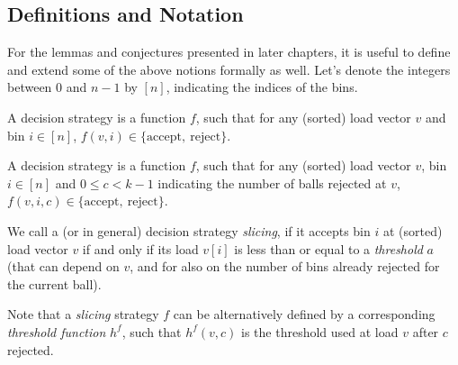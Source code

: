 \subsection{Definitions and Notation} \label{notation}

For the lemmas and conjectures presented in later chapters, it is useful to define and extend some of the above notions formally as well. Let's denote the integers between $0$ and $n-1$ by $[n]$, indicating the indices of the bins.


\begin{definition} 
A \TwoThinning decision strategy is a function $f$, such that for any (sorted) load vector $v$ and bin $i\in[n]$, $f(v, i)\in\{\mathrm{accept},\ \mathrm{reject}\}$.
\end{definition}


\begin{definition} 
A \KThinning decision strategy is a function $f$, such that for any (sorted) load vector $v$, bin $i\in[n]$ and $0\leq c<k-1$ indicating the number of balls rejected at $v$, $f(v, i, c)\in\{\mathrm{accept},\ \mathrm{reject}\}$.
\end{definition}


\begin{definition} 
We call a \TwoThinning (or \KThinning in general) decision strategy \textit{slicing}, if it accepts bin $i$ at (sorted) load vector $v$ if and only if its load $v[i]$ is less than or equal to a \textit{threshold} $a$ (that can depend on $v$, and for \KThinning also on the number of bins already rejected for the current ball). 
\end{definition}


\begin{definition} 
Note that a \KThinning \textit{slicing} strategy $f$ can be alternatively defined by a corresponding \textit{threshold function} $h^f$, such that $h^f(v,c)$ is the threshold used at load $v$ after $c$  rejected.
\end{definition}




